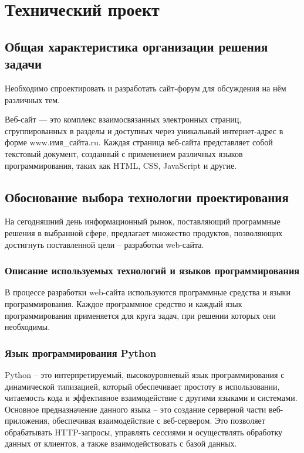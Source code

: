 \section{Технический проект}
\subsection{Общая характеристика организации решения задачи}

Необходимо спроектировать и разработать сайт-форум для обсуждения на нём различных тем.


Веб-сайт — это комплекс взаимосвязанных электронных страниц, сгруппированных в разделы и доступных через уникальный интернет-адрес в форме www.имя\_сайта.ru. Каждая страница веб-сайта представляет собой текстовый документ, созданный с применением различных языков программирования, таких как HTML, CSS, JavaScript и другие.

\subsection{Обоснование выбора технологии проектирования}

На сегодняшний день информационный рынок, поставляющий программные решения в выбранной сфере, предлагает множество продуктов, позволяющих достигнуть поставленной цели – разработки web-сайта.

\subsubsection{Описание используемых технологий и языков программирования}

В процессе разработки web-сайта используются программные средства и языки программирования. Каждое программное средство и каждый язык программирования применяется для круга задач, при решении которых они необходимы.

\subsubsection{Язык программирования Python}

Python – это интерпретируемый, высокоуровневый язык программирования с динамической типизацией, который обеспечивает простоту в использовании, читаемость кода и эффективное взаимодействие с другими языками и системами. Основное предназначение данного языка – это создание серверной части веб-приложения, обеспечивая взаимодействие с веб-сервером. Это позволяет обрабатывать HTTP-запросы, управлять сессиями и осуществлять обработку данных от клиентов, а также взаимодействовать с базой данных.

